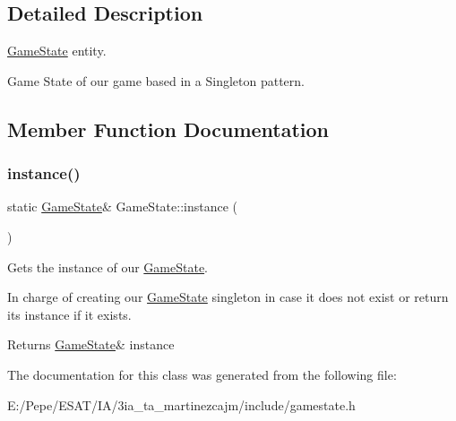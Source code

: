 \subsection{Detailed Description}
\mbox{\hyperlink{class_game_state}{Game\+State}} entity. 

Game State of our game based in a Singleton pattern. 

\subsection{Member Function Documentation}
\mbox{\label{class_game_state_aaf43c32bcc232594c9e9939c4b55f692}} 
\subsubsection{\texorpdfstring{instance()}{instance()}}
{\footnotesize\ttfamily static \mbox{\hyperlink{class_game_state}{Game\+State}}\& Game\+State\+::instance (\begin{DoxyParamCaption}{ }\end{DoxyParamCaption})\hspace{0.3cm}{\ttfamily [static]}}



Gets the instance of our \mbox{\hyperlink{class_game_state}{Game\+State}}. 

In charge of creating our \mbox{\hyperlink{class_game_state}{Game\+State}} singleton in case it does not exist or return its instance if it exists.

\begin{DoxyReturn}{Returns}
\mbox{\hyperlink{class_game_state}{Game\+State}}\& instance 
\end{DoxyReturn}


The documentation for this class was generated from the following file\+:\begin{DoxyCompactItemize}
\item 
E\+:/\+Pepe/\+E\+S\+A\+T/\+I\+A/3ia\+\_\+ta\+\_\+martinezcajm/include/gamestate.\+h\end{DoxyCompactItemize}
